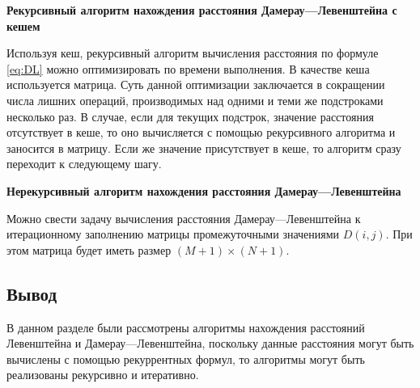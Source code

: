 \textbf{Рекурсивный алгоритм нахождения расстояния Дамерау---Левенштейна с кешем}

Используя кеш, рекурсивный алгоритм вычисления расстояния по формуле \eqref{eq:DL} можно оптимизировать по времени выполнения.  В качестве кеша используется матрица. Суть данной оптимизации заключается в сокращении числа лишних операций, производимых над одними и теми же подстроками несколько раз. В случае, если для текущих подстрок, значение расстояния отсутствует в кеше, то оно вычисляется с помощью рекурсивного алгоритма и заносится в матрицу. Если же значение присутствует в кеше, то алгоритм сразу переходит к следующему шагу.

\textbf{Нерекурсивный алгоритм нахождения расстояния Дамерау---Левенштейна}

Можно свести задачу вычисления расстояния Дамерау---Левенштейна к итерационному заполнению матрицы промежуточными значениями $D(i, j)$. При этом матрица будет иметь размер $(M+1) \times (N+1)$.

\subsection*{Вывод}
В данном разделе были рассмотрены алгоритмы нахождения расстояний Левенштейна и Дамерау---Левенштейна, поскольку данные расстояния могут быть вычислены с помощью рекуррентных формул, то алгоритмы могут быть реализованы рекурсивно и итеративно. 


